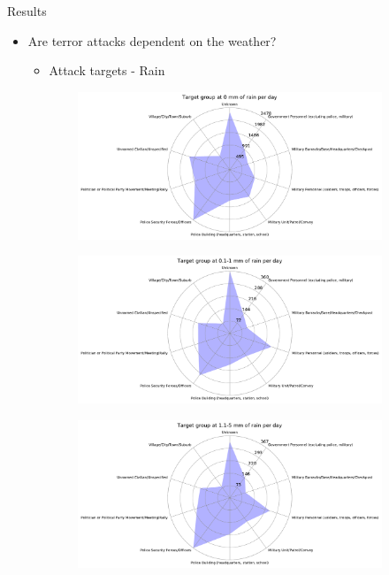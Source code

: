 \documentclass{beamer}
\begin{document}
\begin{frame}{Results}
	\begin{itemize}
		\item 
		Are terror attacks dependent on the weather?
		\begin{itemize}
			\item Attack targets - Rain
		\end{itemize}
	\end{itemize}
	
	\begin{figure}
		\begin{subfigure}[b]{0.3\textwidth}
			\includegraphics[width=\textwidth]{Rain-Target/rain0_starDiagram}
		\end{subfigure}
		\begin{subfigure}[b]{0.3\textwidth}
			\includegraphics[width=\textwidth]{Rain-Target/rain01-1_starDiagram}
		\end{subfigure}
		\begin{subfigure}[b]{0.3\textwidth}
			\includegraphics[width=\textwidth]{Rain-Target/rain11-5_starDiagram}

\end{subfigure}
\end{figure}
\end{frame}
\end{document}

